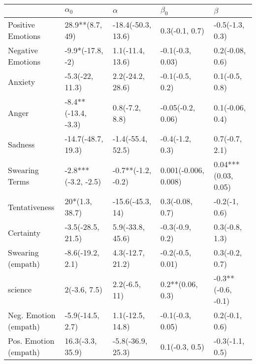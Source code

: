 \begin{tabular}{lllll}
\toprule
{} &           $\alpha_0$ &            $\alpha$ &             $\beta_0$ &              $\beta$ \\
\midrule
Positive Emotions     &      28.9**(8.7, 49) &  -18.4(-50.3, 13.6) &        0.3(-0.1, 0.7) &      -0.5(-1.3, 0.3) \\
Negative Emotions     &     -9.9*(-17.8, -2) &    1.1(-11.4, 13.6) &      -0.1(-0.3, 0.03) &      0.2(-0.08, 0.6) \\
Anxiety               &      -5.3(-22, 11.3) &    2.2(-24.2, 28.6) &       -0.1(-0.5, 0.2) &       0.1(-0.5, 0.8) \\
Anger                 &  -8.4**(-13.4, -3.3) &      0.8(-7.2, 8.8) &     -0.05(-0.2, 0.06) &      0.1(-0.06, 0.4) \\
Sadness               &   -14.7(-48.7, 19.3) &   -1.4(-55.4, 52.5) &       -0.4(-1.2, 0.3) &       0.7(-0.7, 2.1) \\
Swearing Terms        &  -2.8***(-3.2, -2.5) &  -0.7**(-1.2, -0.2) &  0.001(-0.006, 0.008) &  0.04***(0.03, 0.05) \\
Tentativeness         &       20*(1.3, 38.7) &    -15.6(-45.3, 14) &       0.3(-0.08, 0.7) &        -0.2(-1, 0.6) \\
Certainty             &    -3.5(-28.5, 21.5) &    5.9(-33.8, 45.6) &       -0.3(-0.9, 0.2) &       0.3(-0.8, 1.3) \\
Swearing (empath)     &     -8.6(-19.2, 2.1) &    4.3(-12.7, 21.2) &      -0.2(-0.5, 0.01) &       0.3(-0.2, 0.7) \\
science               &         2(-3.6, 7.5) &       2.2(-6.5, 11) &      0.2**(0.06, 0.3) &   -0.3**(-0.6, -0.1) \\
Neg. Emotion (empath) &     -5.9(-14.5, 2.7) &    1.1(-12.5, 14.8) &      -0.1(-0.3, 0.05) &       0.2(-0.1, 0.6) \\
Pos. Emotion (empath) &     16.3(-3.3, 35.9) &   -5.8(-36.9, 25.3) &        0.1(-0.3, 0.5) &      -0.3(-1.1, 0.5) \\
\bottomrule
\end{tabular}
